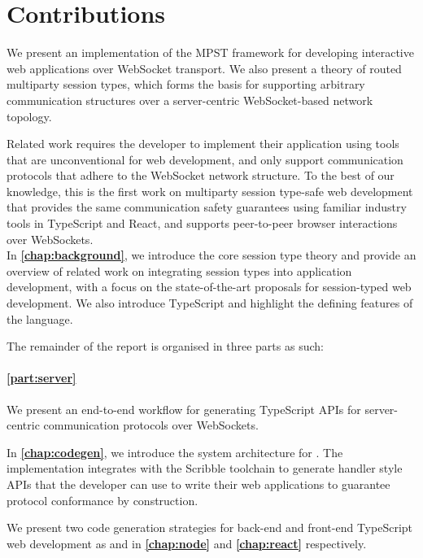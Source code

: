 \section{Contributions}

We present an implementation of the MPST framework for developing
interactive web applications over WebSocket transport.
We also present a theory of routed multiparty session types,
which forms the basis for supporting arbitrary communication structures
over a server-centric WebSocket-based network topology.

Related work \citep{PureScript2019, MVU2020, LINKS, Exceptional} 
requires the 
developer to implement their application using tools that are 
unconventional for web development, 
and only support communication protocols that adhere to the
WebSocket network structure.
To the best of our knowledge, this is the first work on multiparty session
type-safe web development that provides the same communication safety 
guarantees using familiar industry tools in TypeScript and React,
and supports peer-to-peer browser interactions over WebSockets. \\

In \textbf{\cref{chap:background}}, 
we introduce the core session type theory
and provide an overview of related work on integrating session types into
application development, with a focus on the state-of-the-art
proposals for session-typed web development. 
We also introduce TypeScript and highlight the 
defining features of the language.

The remainder of the report is organised in three parts as such:

\paragraph{\cref{part:server}}
We present an end-to-end workflow for generating TypeScript APIs for 
server-centric communication protocols over WebSockets. 

In \textbf{\cref{chap:codegen}}, 
we introduce the system architecture for
\codegen. 
The implementation integrates with the Scribble
toolchain to generate handler style APIs that the developer can use to write 
their web applications to guarantee protocol conformance by construction.

We present two code generation strategies for back-end and front-end
TypeScript web development as \nodecodegen and \reactcodegen
in \textbf{\cref{chap:node}} and \textbf{\cref{chap:react}} respectively.


